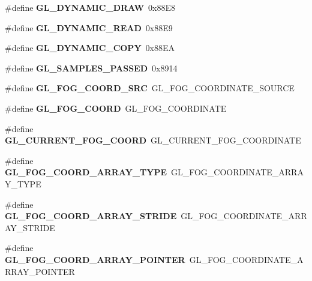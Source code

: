 \begin{DoxyCompactItemize}
\item 
\#define {\bfseries G\+L\+\_\+\+D\+Y\+N\+A\+M\+I\+C\+\_\+\+D\+R\+A\+W}~0x88\+E8\label{_s_d_l__opengl_8h_ac1915ebc9c952b9e7140f4bcc78319a6}

\item 
\#define {\bfseries G\+L\+\_\+\+D\+Y\+N\+A\+M\+I\+C\+\_\+\+R\+E\+A\+D}~0x88\+E9\label{_s_d_l__opengl_8h_a40b4752ffc850a91fc26d507395511fd}

\item 
\#define {\bfseries G\+L\+\_\+\+D\+Y\+N\+A\+M\+I\+C\+\_\+\+C\+O\+P\+Y}~0x88\+E\+A\label{_s_d_l__opengl_8h_ad35941788a5c3ad4a19c3263fff294e8}

\item 
\#define {\bfseries G\+L\+\_\+\+S\+A\+M\+P\+L\+E\+S\+\_\+\+P\+A\+S\+S\+E\+D}~0x8914\label{_s_d_l__opengl_8h_ab0f6ab004415a67dd3d9be86546c0391}

\item 
\#define {\bfseries G\+L\+\_\+\+F\+O\+G\+\_\+\+C\+O\+O\+R\+D\+\_\+\+S\+R\+C}~G\+L\+\_\+\+F\+O\+G\+\_\+\+C\+O\+O\+R\+D\+I\+N\+A\+T\+E\+\_\+\+S\+O\+U\+R\+C\+E\label{_s_d_l__opengl_8h_aa095dda8f5d3ad5912500f8336bacf59}

\item 
\#define {\bfseries G\+L\+\_\+\+F\+O\+G\+\_\+\+C\+O\+O\+R\+D}~G\+L\+\_\+\+F\+O\+G\+\_\+\+C\+O\+O\+R\+D\+I\+N\+A\+T\+E\label{_s_d_l__opengl_8h_a54ca0b81f388c56a0f5ed4284de238a6}

\item 
\#define {\bfseries G\+L\+\_\+\+C\+U\+R\+R\+E\+N\+T\+\_\+\+F\+O\+G\+\_\+\+C\+O\+O\+R\+D}~G\+L\+\_\+\+C\+U\+R\+R\+E\+N\+T\+\_\+\+F\+O\+G\+\_\+\+C\+O\+O\+R\+D\+I\+N\+A\+T\+E\label{_s_d_l__opengl_8h_ac388147bbc1fc6a83e5f077ba26d1cdf}

\item 
\#define {\bfseries G\+L\+\_\+\+F\+O\+G\+\_\+\+C\+O\+O\+R\+D\+\_\+\+A\+R\+R\+A\+Y\+\_\+\+T\+Y\+P\+E}~G\+L\+\_\+\+F\+O\+G\+\_\+\+C\+O\+O\+R\+D\+I\+N\+A\+T\+E\+\_\+\+A\+R\+R\+A\+Y\+\_\+\+T\+Y\+P\+E\label{_s_d_l__opengl_8h_a7a488608b5044635725a445489ce55f0}

\item 
\#define {\bfseries G\+L\+\_\+\+F\+O\+G\+\_\+\+C\+O\+O\+R\+D\+\_\+\+A\+R\+R\+A\+Y\+\_\+\+S\+T\+R\+I\+D\+E}~G\+L\+\_\+\+F\+O\+G\+\_\+\+C\+O\+O\+R\+D\+I\+N\+A\+T\+E\+\_\+\+A\+R\+R\+A\+Y\+\_\+\+S\+T\+R\+I\+D\+E\label{_s_d_l__opengl_8h_aec9cd977adc76140ecc083db90d5cb2a}

\item 
\#define {\bfseries G\+L\+\_\+\+F\+O\+G\+\_\+\+C\+O\+O\+R\+D\+\_\+\+A\+R\+R\+A\+Y\+\_\+\+P\+O\+I\+N\+T\+E\+R}~G\+L\+\_\+\+F\+O\+G\+\_\+\+C\+O\+O\+R\+D\+I\+N\+A\+T\+E\+\_\+\+A\+R\+R\+A\+Y\+\_\+\+P\+O\+I\+N\+T\+E\+R\label{_s_d_l__opengl_8h_a80ead4fe1d89080d7f830e9dd1fd8871}


\end{DoxyCompactItemize}
